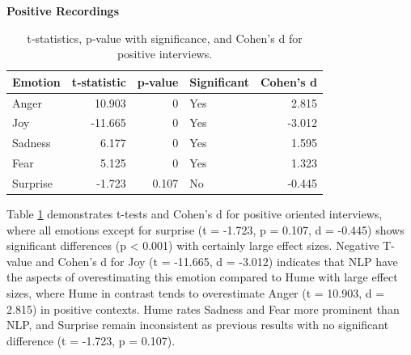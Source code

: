 \begin{table}[H]
    \centering
    \caption*{\textbf{Positive Recordings}}
    \begin{tabular}{lrrlr}
      \toprule
      \textbf{Emotion} & \textbf{t‐statistic} & \textbf{p‐value} & \textbf{Significant} & \textbf{Cohen's d} \\
      \midrule
      Anger    & 10.903  & 0       & Yes & 2.815  \\
      Joy      & -11.665 & 0       & Yes & -3.012 \\
      Sadness  & 6.177   & 0       & Yes & 1.595  \\
      Fear     & 5.125   & 0       & Yes & 1.323  \\
      Surprise & -1.723  & 0.107   & No  & -0.445 \\
      \bottomrule
    \end{tabular}
    \caption{t‐statistics, p‐value with significance, and Cohen's d for positive interviews.}
    \label{tab:t-test-pos}
\end{table}
Table \ref{tab:t-test-pos} demonstrates t-tests and Cohen's d for positive oriented interviews, where all emotions except for surprise (t = -1.723, p = 0.107, d = -0.445) shows significant differences (p < 0.001)
with certainly large effect sizes. Negative T-value and Cohen's d for Joy (t = -11.665, d = -3.012) indicates that NLP have the aspects of overestimating this emotion compared to Hume with large effect sizes, where Hume in contrast tends to overestimate Anger (t = 10.903, d = 2.815) in positive contexts. 
Hume rates Sadness and Fear more prominent than NLP, and Surprise remain inconsistent as previous results with no significant difference (t = -1.723, p = 0.107). 

